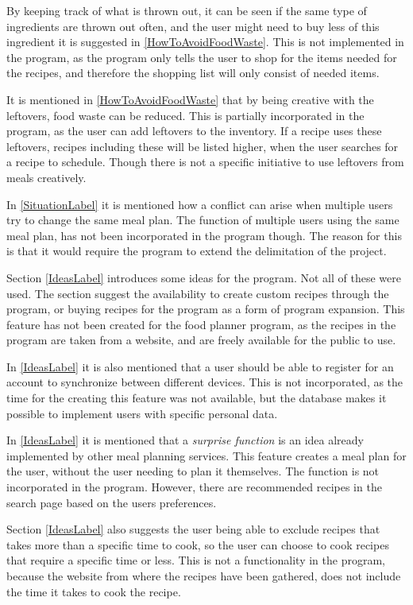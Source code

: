 By keeping track of what is thrown out, it can be seen if the same type of ingredients are thrown out often, and the user might need to buy less of this ingredient it is suggested in \cref{HowToAvoidFoodWaste}. This is not implemented in the program, as the program only tells the user to shop for the items needed for the recipes, and therefore the shopping list will only consist of needed items. 

It is mentioned in \cref{HowToAvoidFoodWaste} that by being creative with the leftovers, food waste can be reduced. This is partially incorporated in the program, as the user can add leftovers to the inventory. If a recipe uses these leftovers, recipes including these will be listed higher, when the user searches for a recipe to schedule. Though there is not a specific initiative to use leftovers from meals creatively.

In \cref{SituationLabel} it is mentioned how a conflict can arise when multiple users try to change the same meal plan. The function of multiple users using the same meal plan, has not been incorporated in the program though. The reason for this is that it would require the program to extend the delimitation of the project.

Section \ref{IdeasLabel} introduces some ideas for the program. Not all of these were used. The section suggest the availability to create custom recipes through the program, or buying recipes for the program as a form of program expansion. This feature has not been created for the food planner program, as the recipes in the program are taken from a website\cite{BigOven}, and are freely available for the public to use.

In \cref{IdeasLabel} it is also mentioned that a user should be able to register for an account to synchronize between different devices. This is not incorporated, as the time for the creating this feature was not available, but the database makes it possible to implement users with specific personal data.

In \cref{IdeasLabel} it is mentioned that a \textit{surprise function} is an idea already implemented by other meal planning services. This feature creates a meal plan for the user, without the user needing to plan it themselves. The function is not incorporated in the program. However, there are recommended recipes in the search page based on the users preferences.

Section \ref{IdeasLabel} also suggests the user being able to exclude recipes that takes more than a specific time to cook, so the user can choose to cook recipes that require a specific time or less. This is not a functionality in the program, because the website from where the recipes have been gathered, does not include the time it takes to cook the recipe.

